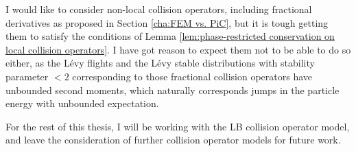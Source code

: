     \begin{remark}
        I would like to consider non-local collision operators, including fractional derivatives as proposed in Section \ref{cha:FEM vs. PiC}, but it is tough getting them to satisfy the conditions of Lemma \ref{lem:phase-restricted conservation on local collision operators}. I have got reason to expect them not to be able to do so either, as the Lévy flights and the Lévy stable distributions with stability parameter $< 2$ corresponding to those fractional collision operators have unbounded second moments, which naturally corresponds jumps in the particle energy with unbounded expectation.

        For the rest of this thesis, I will be working with the LB collision operator model, and leave the consideration of further collision operator models for future work.
    \end{remark}
    